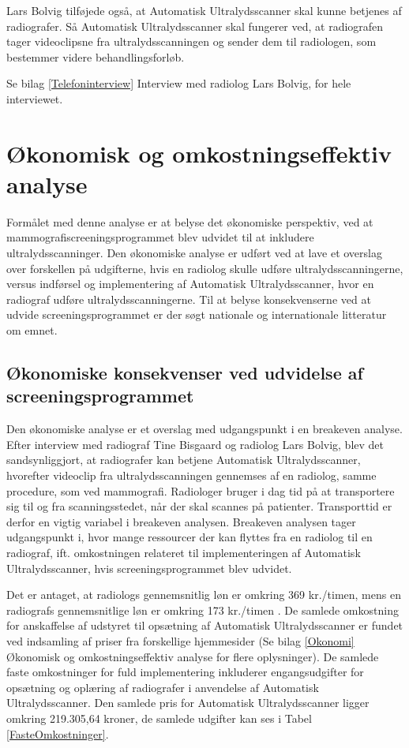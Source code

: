 Lars Bolvig tilføjede også, at Automatisk Ultralydsscanner skal kunne betjenes af radiografer. Så Automatisk Ultralydsscanner skal fungerer ved, at radiografen tager videoclipsne fra ultralydsscanningen og sender dem til radiologen, som bestemmer videre behandlingsforløb.

Se bilag \ref{Telefoninterview} Interview med radiolog Lars Bolvig, for hele interviewet. 

\section{Økonomisk og omkostningseffektiv analyse}
Formålet med denne analyse er at belyse det økonomiske perspektiv, ved at mammografiscreeningsprogrammet blev udvidet til at inkludere ultralydsscanninger. Den økonomiske analyse er udført ved at lave et overslag over forskellen på udgifterne, hvis en radiolog skulle udføre ultralydsscanningerne, versus indførsel og implementering af Automatisk Ultralydsscanner, hvor en radiograf udføre ultralydsscanningerne. Til at belyse konsekvenserne ved at udvide screeningsprogrammet er der søgt nationale og internationale litteratur om emnet. 

\subsection{Økonomiske konsekvenser ved udvidelse af screeningsprogrammet} 
Den økonomiske analyse er et overslag med udgangspunkt i en breakeven analyse. Efter interview med radiograf Tine Bisgaard og radiolog Lars Bolvig, blev det sandsynliggjort, at radiografer kan betjene Automatisk Ultralydsscanner, hvorefter videoclip fra ultralydsscanningen gennemses af en radiolog, samme procedure, som ved mammografi. 
Radiologer bruger i dag tid på at transportere sig til og fra scanningsstedet, når der skal scannes på patienter. Transporttid er derfor en vigtig variabel i breakeven analysen. Breakeven analysen tager udgangspunkt i, hvor mange ressourcer der kan flyttes fra en radiolog til en radiograf, ift. omkostningen relateret til implementeringen af Automatisk Ultralydsscanner, hvis screeningsprogrammet blev udvidet. 

Det er antaget, at radiologs gennemsnitlig løn er omkring 369 kr./timen, mens en radiografs gennemsnitlige løn er omkring 173 kr./timen \cite{Lon}. De samlede omkostning for anskaffelse af udstyret til opsætning af Automatisk Ultralydsscanner er fundet ved indsamling af priser fra forskellige hjemmesider (Se bilag \ref{Okonomi} Økonomisk og omkostningseffektiv analyse for flere oplysninger). De samlede faste omkostninger for fuld implementering inkluderer engangsudgifter for opsætning og oplæring af radiografer i anvendelse af Automatisk Ultralydsscanner. Den samlede pris for Automatisk Ultralydsscanner ligger omkring 219.305,64 kroner, de samlede udgifter kan ses i Tabel \ref{FasteOmkostninger}. 

